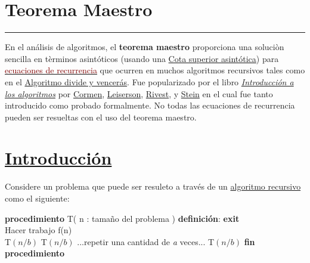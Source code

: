 \documentclass[a4paper,11pt]{article}
\title{}
\author{Michael Paucar}
\date{12 de abril de 2020}
\begin{document}
\maketitle

\section*{Teorema Maestro}\noindent
{\color {Gray} \rule {\linewidth}{0.1mm}}\newline%
En el análisis de algoritmos, el \textbf{teorema maestro} proporciona una soluciòn sencilla en tèrminos asintóticos (usando una \href{https://es.wikipedia.org/wiki/Cota_superior_asintótica}{Cota superior asintótica}) para \href{https://es.wikipedia.org/w/index.php?title=Ecuaciones_de_recurrencia&action=edit&redlink=1}{\textcolor{Maroon}{ecuaciones de recurrencia}} que ocurren en muchos algoritmos recursivos tales como en el
\href{https://es.wikipedia.org/wiki/Algoritmo_divide_y_vencerás}{Algoritmo divide y vencerás}. Fue popularizado por el libro \href{https://es.wikipedia.org/wiki/Introducción_a_los_algoritmos}{\textit{Introducción a los algoritmos}} por \href{https://es.wikipedia.org/wiki/Thomas_H._Cormen}{Cormen}, \href{https://es.wikipedia.org/wiki/Charles_E._Leiserson}{Leiserson}, \href{https://es.wikipedia.org/wiki/Ron_Rivest}{Rivest}, y \href{https://es.wikipedia.org/wiki/Clifford_Stein}{Stein} en el cual fue tanto introducido como probado formalmente. No todas las ecuaciones de recurrencia pueden ser resueltas con el uso del teorema maestro.\cite{wiki:xxx}

	\tableofcontents
\noindent{\color {Gray} \rule {\linewidth}{0.1mm}}	

\newpage
\section[Introducción]{\hyperlink{toc}{Introducción}}
\noindent{\color {Gray} \rule {\linewidth}{0.1mm}}
Considere un problema que puede ser resuleto  a través de un \href{https://es.wikipedia.org/wiki/Algoritmo_recursivo}{algoritmo recursivo} como el siguiente:\\

\begin{algorithmic}
\State \textbf{procedimiento} T( n : tamaño del problema ) \textbf{definición}:
 \textbf{exit}\\
\State Hacer trabajo f(n)\\
\State T$(n/b)$
\State T$(n/b)$
\State ...repetir una cantidad de \textit{a} veces...
\State T$(n/b)$
\State \textbf{fin procedimiento}
\EndIf\\
\end{algorithmic}
\end{document}
